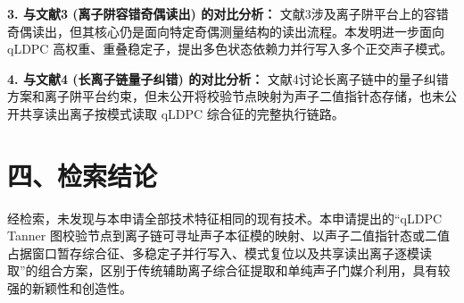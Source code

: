 \documentclass[12pt,a4paper]{article}
\begin{document}
\textbf{3. 与文献3 (离子阱容错奇偶读出) 的对比分析：}
文献3涉及离子阱平台上的容错奇偶读出，但其核心仍是面向特定奇偶测量结构的读出流程。本发明进一步面向 qLDPC 高权重、重叠稳定子，提出多色状态依赖力并行写入多个正交声子模式。

\textbf{4. 与文献4 (长离子链量子纠错) 的对比分析：}
文献4讨论长离子链中的量子纠错方案和离子阱平台约束，但未公开将校验节点映射为声子二值指针态存储，也未公开共享读出离子按模式读取 qLDPC 综合征的完整执行链路。

\section*{四、检索结论}

经检索，未发现与本申请全部技术特征相同的现有技术。本申请提出的“qLDPC Tanner 图校验节点到离子链可寻址声子本征模的映射、以声子二值指针态或二值占据窗口暂存综合征、多稳定子并行写入、模式复位以及共享读出离子逐模读取”的组合方案，区别于传统辅助离子综合征提取和单纯声子门媒介利用，具有较强的新颖性和创造性。
\end{document}
